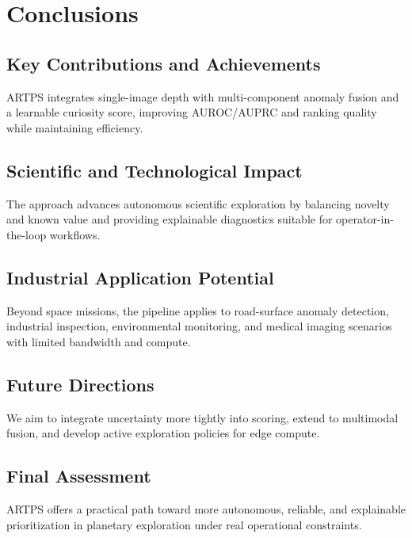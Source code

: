 \documentclass[12pt]{article}
\begin{document}
\section{Conclusions}
\subsection{Key Contributions and Achievements}
ARTPS integrates single-image depth with multi-component anomaly fusion and a learnable curiosity score, improving AUROC/AUPRC and ranking quality while maintaining efficiency.

\subsection{Scientific and Technological Impact}
The approach advances autonomous scientific exploration by balancing novelty and known value and providing explainable diagnostics suitable for operator-in-the-loop workflows.

\subsection{Industrial Application Potential}
Beyond space missions, the pipeline applies to road-surface anomaly detection, industrial inspection, environmental monitoring, and medical imaging scenarios with limited bandwidth and compute.

\subsection{Future Directions}
We aim to integrate uncertainty more tightly into scoring, extend to multimodal fusion, and develop active exploration policies for edge compute.

\subsection{Final Assessment}
ARTPS offers a practical path toward more autonomous, reliable, and explainable prioritization in planetary exploration under real operational constraints.

\clearpage
\end{document}
